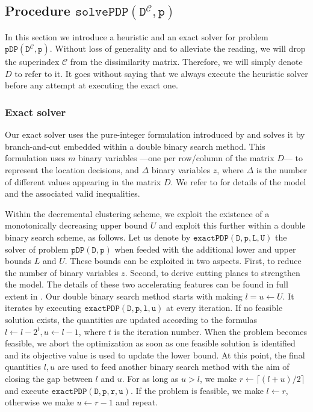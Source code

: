 \documentclass[a4paper,10pt]{article}
\newcommand{\pdp}[2]{$\mathtt{pDP({#1}, {#2})}$}
\newcommand{\mC}{\mathcal{C}}
\newcommand{\DmC}{D^{\mC}}
\newcommand{\solvePDP}[2]{$\mathtt{solvePDP({#1}, {#2})}$}
\newcommand{\exactPDP}[4]{$\mathtt{exactPDP({#1}, {#2}, {#3}, {#4})}$}
\begin{document}
\subsection{Procedure \solvePDP{\DmC}{p}\label{section:decrclust:solvepdp}}

In this section we introduce a heuristic and an exact solver for problem \pdp{\DmC}{p}. Without loss of generality and to alleviate the reading, we will drop the superindex $\mC$ from the dissimilarity matrix. Therefore, we will simply denote $D$ to refer to it. It goes without saying that we always execute the heuristic solver before any attempt at executing the exact one.

\subsubsection{Exact solver}

Our exact solver uses the pure-integer formulation introduced by \citet{Sayah2017new} and solves it by branch-and-cut embedded within a double binary search method. This formulation uses $m$ binary variables ---one per row/column of the matrix $D$--- to represent the location decisions, and $\Delta$ binary variables $z$, where $\Delta$ is the number of different values appearing in the matrix $D$. We refer to \citet{Sayah2017new} for details of the model and the associated valid inequalities.

Within the decremental clustering scheme, we exploit the existence of a monotonically decreasing upper bound $U$ and exploit this further within a double binary search scheme, as follows. Let us denote by \exactPDP{D}{p}{L}{U} the solver of problem \pdp{D}{p} when feeded with the additional lower and upper bounds $L$ and $U$. These bounds can be exploited in two aspects. First, to reduce the number of binary variables $z$. Second, to derive cutting planes to strengthen the model. The details of these two accelerating features can be found in full extent in \citet{Sayah2017new}. Our double binary search method starts with making $l = u \leftarrow U$. It iterates by executing \exactPDP{D}{p}{l}{u} at every iteration. If no feasible solution exists, the quantities are updated according to the formulas $l\leftarrow l - 2^t, u \leftarrow l - 1$, where $t$ is the iteration number. When the problem becomes feasible, we abort the optimization as soon as one feasible solution is identified and its objective value is used to update the lower bound. At this point, the final quantities $l, u$ are used to feed another binary search method with the aim of closing the gap between $l$ and $u$. For as long as $u > l$, we make $r\leftarrow \lceil (l + u) / 2\rceil$ and execute \exactPDP{D}{p}{r}{u}. If the problem is feasible, we make $l\leftarrow r$, otherwise we make $u\leftarrow r - 1$ and repeat.
\end{document}
